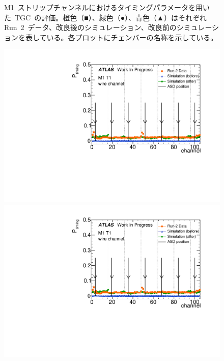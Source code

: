 \begin{figure}[htbp]
\begin{minipage}{0.49\hsize}
			\end{minipage}
		\caption[M1~ストリップチャンネルにおけるタイミングパラメータを用いた~TGC~の評価。]{M1~ストリップチャンネルにおけるタイミングパラメータを用いた~TGC~の評価。橙色（■）、緑色（●）、青色（▲）はそれぞれRun~2~データ、改良後のシミュレーション、改良前のシミュレーションを表している。各プロットにチェンバーの名称を示している。}
		\label{fig:timingPlotCompStripM1}
	\end{figure}
	
	\begin{figure}[htbp]
            \begin{minipage}{0.49\hsize}
        	\centering
			\includegraphics[width=\textwidth,page=13]{img/pdf5/master_timingplot_comp.pdf}
			\end{minipage}
			\begin{minipage}{0.49\hsize}
			\centering
			\includegraphics[width=\textwidth,page=15]{img/pdf5/master_timingplot_comp.pdf}

\end{minipage}
\end{figure}
